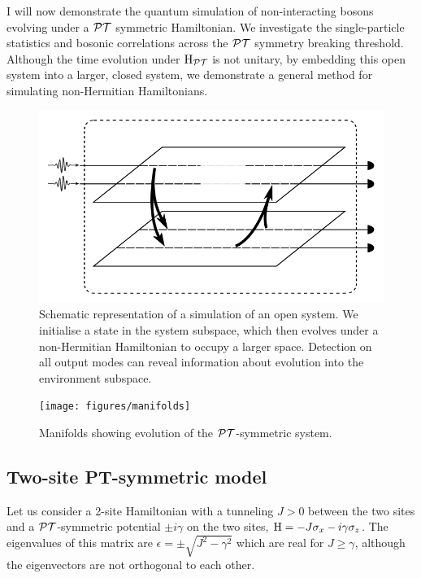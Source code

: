 I will now demonstrate the quantum simulation of non-interacting bosons
evolving under a \(\mathcal{PT}{}\) symmetric
Hamiltonian. We investigate the single-particle statistics and bosonic
correlations across the \(\mathcal{PT}{}\) symmetry breaking threshold. Although the time
evolution under \(\mathrm{H}_{\mathcal{PT}{}}\) is not unitary, by embedding this open
system into a larger, closed system, we demonstrate a general method for
simulating non-Hermitian Hamiltonians.

\begin{figure}[t]
  \centering
  \includegraphics{figures/opensystem}
  \caption[Representation of an open system]
  {Schematic representation of a simulation of an open system. We initialise a
  state in the system subspace, which then evolves under a non-Hermitian
  Hamiltonian to occupy a larger space. Detection on all output modes can reveal
  information about evolution into the environment subspace.}
  \label{fig:opensystem}
\end{figure}

\begin{figure}[t]
  \centering
  \texttt{[image: figures/manifolds]}
  \caption[Manifolds showing evolution of the PT-symmetric system]
  {Manifolds showing evolution of the \(\mathcal{PT}{}\)-symmetric system.}
  \label{fig:manifolds}
\end{figure}

\subsection{Two-site PT-symmetric model}
Let us consider a 2-site Hamiltonian with a tunneling \(J > 0\) between the two
sites and a \(\mathcal{PT}{}\)-symmetric potential \(\pm i \gamma\) on the two sites, \(
\mathrm{H} = -J \sigma_x -i \gamma \sigma_z\). The eigenvalues of this matrix are
\( \epsilon = \pm \sqrt{J^{2} - \gamma^{2}} \) which are real for \( J \geq
\gamma \), although the eigenvectors are not orthogonal to each other.

